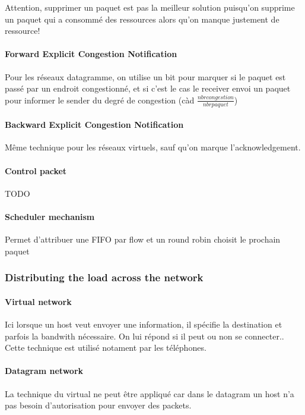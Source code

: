 Attention, supprimer un paquet est pas la meilleur solution puisqu'on supprime un paquet
qui a consommé des ressources alors qu'on manque justement de ressource!

\paragraph{Forward Explicit Congestion Notification}
Pour les réseaux datagramme,
on utilise un bit pour marquer si le paquet est passé par un endroit congestionné,
et si c'est le cas le receiver envoi un paquet pour informer le sender du degré
de congestion (càd $\frac{nbr congestion}{nbr paquet}$)

\paragraph{Backward Explicit Congestion Notification}
Même technique pour les réseaux virtuels, sauf qu'on marque l'acknowledgement.

\paragraph{Control packet}
TODO

\paragraph{Scheduler mechanism}
Permet d'attribuer une FIFO par flow et un round robin choisit le prochain paquet


\subsubsection{Distributing the load across the network}

\paragraph{Virtual network}
Ici lorsque un host veut envoyer une information, il spécifie la destination et parfois la
bandwith nécessaire. On lui répond si il peut ou non se connecter.. Cette technique
est utilisé notament par les téléphones.

\paragraph{Datagram network}
La technique du virtual ne peut être appliqué car dans le datagram un host n'a pas
besoin d'autorisation pour envoyer des packets.

